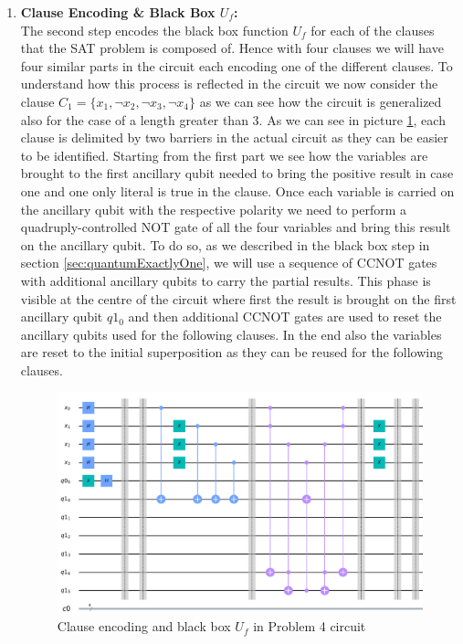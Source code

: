 \documentclass[english]{article}
\begin{document}
\begin{enumerate}
					\item \textbf{Clause Encoding \& Black Box $U_f$:}\\
						The second step encodes the black box function $U_f$ for each of the clauses that the SAT problem is composed of. Hence with four clauses we will have four similar parts in the circuit each encoding one of the different clauses. To understand how this process is reflected in the circuit we now consider the clause $C_1 = \{x_1, \neg x_2, \neg x_3, \neg x_4\}$ as we can see how the circuit is generalized also for the case of a length greater than 3. As we can see in picture \ref{fig:clauseEncodingCircuit}, each clause is delimited by two barriers in the actual circuit as they can be easier to be identified. Starting from the first part we see how the variables are brought to the first ancillary qubit needed to bring the positive result in case one and one only literal is true in the clause. Once each variable is carried on the ancillary qubit with the respective polarity we need to perform a quadruply-controlled NOT gate of all the four variables and bring this result on the ancillary qubit. To do so, as we described in the black box step in section \ref{sec:quantumExactlyOne}, we will use a sequence of CCNOT gates with additional ancillary qubits to carry the partial results. This phase is visible at the centre of the circuit where first the result is brought on the first ancillary qubit $q1_0$ and then additional CCNOT gates are used to reset the ancillary qubits used for the following clauses. In the end also the variables are reset to the initial superposition as they can be reused for the following clauses.
						\begin{figure}[h]
							\centering
							\includegraphics[scale=0.55]{Clause_Encoding_Circuit.png}
							\caption{
								\label{fig:clauseEncodingCircuit}
								Clause encoding and black box $U_f$ in Problem 4 circuit
							}
						\end{figure}
					

\end{enumerate}
\end{document}
